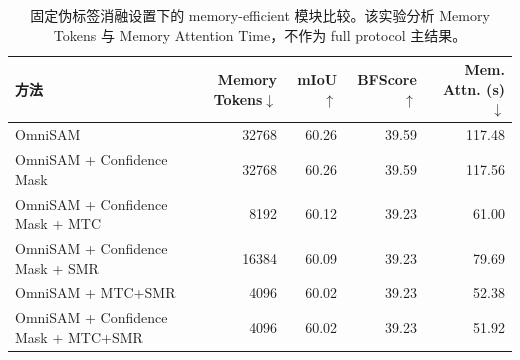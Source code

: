 \begin{table}[t]
  \centering
  \small
  \setlength{\tabcolsep}{4pt}
  \renewcommand{\arraystretch}{1.08}
  \caption{固定伪标签消融设置下的 memory-efficient 模块比较。该实验分析 Memory Tokens 与 Memory Attention Time，不作为 full protocol 主结果。}
  \label{tab:memory_ablation}
  \begin{tabular}{lrrrr}
    \toprule
    方法 & Memory Tokens$\downarrow$ & mIoU$\uparrow$ & BFScore$\uparrow$ & Mem. Attn. (s)$\downarrow$ \\
    \midrule
    OmniSAM & 32768 & 60.26 & 39.59 & 117.48 \\
    OmniSAM + Confidence Mask & 32768 & 60.26 & 39.59 & 117.56 \\
    OmniSAM + Confidence Mask + MTC & 8192 & 60.12 & 39.23 & 61.00 \\
    OmniSAM + Confidence Mask + SMR & 16384 & 60.09 & 39.23 & 79.69 \\
    OmniSAM + MTC+SMR & 4096 & 60.02 & 39.23 & 52.38 \\
    OmniSAM + Confidence Mask + MTC+SMR & 4096 & 60.02 & 39.23 & 51.92 \\
    \bottomrule
  \end{tabular}
\end{table}
